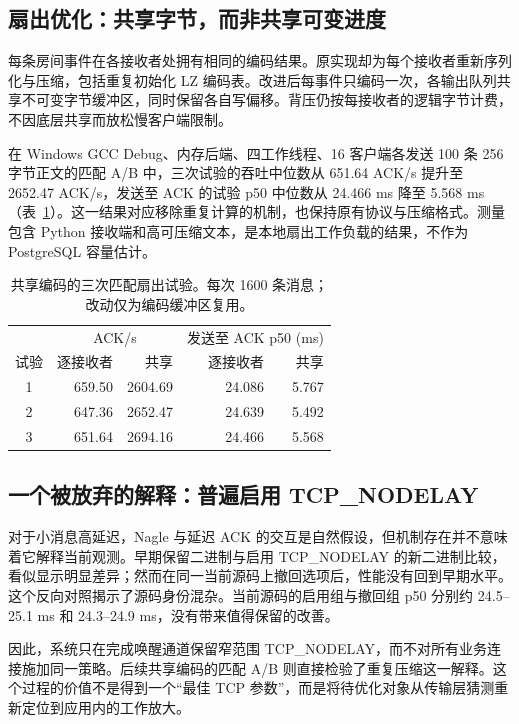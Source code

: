 \subsection{扇出优化：共享字节，而非共享可变进度}
每条房间事件在各接收者处拥有相同的编码结果。原实现却为每个接收者重新序列化与压缩，包括重复初始化 LZ 编码表。改进后每事件只编码一次，各输出队列共享不可变字节缓冲区，同时保留各自写偏移。背压仍按每接收者的逻辑字节计费，不因底层共享而放松慢客户端限制。

在 Windows GCC Debug、内存后端、四工作线程、16 客户端各发送 100 条 256 字节正文的匹配 A/B 中，三次试验的吞吐中位数从 651.64 ACK/s 提升至 2652.47 ACK/s，发送至 ACK 的试验 p50 中位数从 24.466 ms 降至 5.568 ms（表~\ref{tab:fanout}）。这一结果对应移除重复计算的机制，也保持原有协议与压缩格式。测量包含 Python 接收端和高可压缩文本，是本地扇出工作负载的结果，不作为 PostgreSQL 容量估计。

\begin{table}[t]
\caption{共享编码的三次匹配扇出试验。每次 1600 条消息；改动仅为编码缓冲区复用。}
\label{tab:fanout}
\centering\small
\begin{tabular}{crrrr}
\toprule
 & \multicolumn{2}{c}{ACK/s} & \multicolumn{2}{c}{发送至 ACK p50 (ms)}\\
试验 & 逐接收者 & 共享 & 逐接收者 & 共享\\
\midrule
1 & 659.50 & 2604.69 & 24.086 & 5.767\\
2 & 647.36 & 2652.47 & 24.639 & 5.492\\
3 & 651.64 & 2694.16 & 24.466 & 5.568\\
\bottomrule
\end{tabular}
\end{table}

\subsection{一个被放弃的解释：普遍启用 TCP\_NODELAY}
对于小消息高延迟，Nagle 与延迟 ACK 的交互是自然假设，但机制存在并不意味着它解释当前观测。早期保留二进制与启用 TCP\_NODELAY 的新二进制比较，看似显示明显差异；然而在同一当前源码上撤回选项后，性能没有回到早期水平。这个反向对照揭示了源码身份混杂。当前源码的启用组与撤回组 p50 分别约 24.5--25.1 ms 和 24.3--24.9 ms，没有带来值得保留的改善。

因此，系统只在完成唤醒通道保留窄范围 TCP\_NODELAY，而不对所有业务连接施加同一策略。后续共享编码的匹配 A/B 则直接检验了重复压缩这一解释。这个过程的价值不是得到一个“最佳 TCP 参数”，而是将待优化对象从传输层猜测重新定位到应用内的工作放大。

